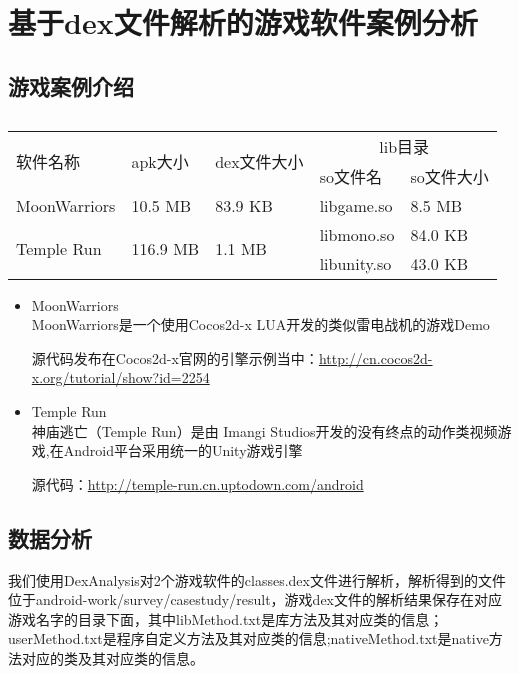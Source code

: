 \section{基于dex文件解析的游戏软件案例分析}
\label{dexanalysis}

\subsection{游戏案例介绍}

\begin{table}[H]
\caption{}
\begin{tabular}{|p{2.5cm}|p{2cm}|p{2.1cm}|p{2cm}|p{2cm}|}
\hline
\multirow{2}{*}{软件名称} & \multirow{2}{*}{apk大小}  & \multirow{2}{*}{dex文件大小} & \multicolumn{2}{|c|}{lib目录} \\
\cline{4-5}
& & & so文件名 & so文件大小\\
\hline
MoonWarriors & 10.5 MB & 83.9 KB & libgame.so & 8.5 MB \\
\hline
\multirow{2}{*}{Temple Run} & \multirow{2}{*}{116.9 MB} & \multirow{2}{*}{1.1 MB} & libmono.so & 84.0 KB\\
\cline{4-5}
& & & libunity.so & 43.0 KB\\
\hline
\end{tabular}
\end{table}

\begin{itemize}
\item MoonWarriors\\
MoonWarriors是一个使用Cocos2d-x LUA开发的类似雷电战机的游戏Demo

源代码发布在Cocos2d-x官网的引擎示例当中：\url{http://cn.cocos2d-x.org/tutorial/show?id=2254}

\item Temple Run\\
神庙逃亡（Temple Run）是由 Imangi Studios开发的没有终点的动作类视频游戏,在Android平台采用统一的Unity游戏引擎

源代码：\url{http://temple-run.cn.uptodown.com/android}

\end{itemize}

\subsection{数据分析}
我们使用DexAnalysis对2个游戏软件的classes.dex文件进行解析，解析得到的文件位于android-work/survey/casestudy/result，游戏dex文件的解析结果保存在对应游戏名字的目录下面，其中libMethod.txt是库方法及其对应类的信息；userMethod.txt是程序自定义方法及其对应类的信息;nativeMethod.txt是native方法对应的类及其对应类的信息。

